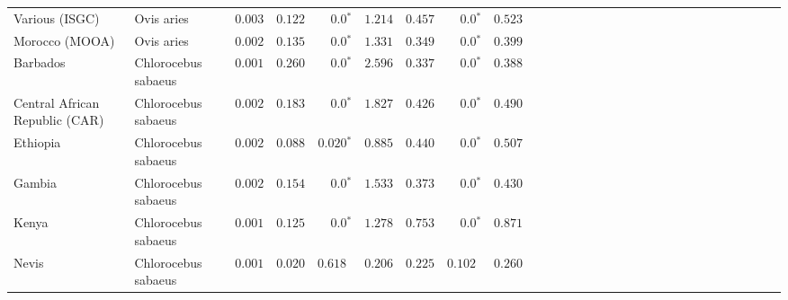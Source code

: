 \begin{center}
\begin{adjustbox}{width = 1\textwidth}
\begin{tabular}{|l|l|r|r|r|r|r|r|r|r|r|r|r|r|r|r|r|r|r|r|r|r|r|r|r|r|r|r|r|}
                 Various (ISGC) &           Ovis aries &           $ 0.003$ &                      $ 0.122$ &                  $\bm{0.0{^*}}$ &                                           $ 1.214$ &                      $ 0.457$ &                  $\bm{0.0{^*}}$ &                                           $ 0.523$ \\
                 Morocco (MOOA) &           Ovis aries &           $ 0.002$ &                      $ 0.135$ &                  $\bm{0.0{^*}}$ &                                           $ 1.331$ &                      $ 0.349$ &                  $\bm{0.0{^*}}$ &                                           $ 0.399$ \\
                       Barbados &  Chlorocebus sabaeus &           $ 0.001$ &                      $ 0.260$ &                  $\bm{0.0{^*}}$ &                                           $ 2.596$ &                      $ 0.337$ &                  $\bm{0.0{^*}}$ &                                           $ 0.388$ \\
 Central African Republic (CAR) &  Chlorocebus sabaeus &           $ 0.002$ &                      $ 0.183$ &                  $\bm{0.0{^*}}$ &                                           $ 1.827$ &                      $ 0.426$ &                  $\bm{0.0{^*}}$ &                                           $ 0.490$ \\
                       Ethiopia &  Chlorocebus sabaeus &           $ 0.002$ &                      $ 0.088$ &               $\bm{ 0.020{^*}}$ &                                           $ 0.885$ &                      $ 0.440$ &                  $\bm{0.0{^*}}$ &                                           $ 0.507$ \\
                         Gambia &  Chlorocebus sabaeus &           $ 0.002$ &                      $ 0.154$ &                  $\bm{0.0{^*}}$ &                                           $ 1.533$ &                      $ 0.373$ &                  $\bm{0.0{^*}}$ &                                           $ 0.430$ \\
                          Kenya &  Chlorocebus sabaeus &           $ 0.001$ &                      $ 0.125$ &                  $\bm{0.0{^*}}$ &                                           $ 1.278$ &                      $ 0.753$ &                  $\bm{0.0{^*}}$ &                                           $ 0.871$ \\
                          Nevis &  Chlorocebus sabaeus &           $ 0.001$ &                      $ 0.020$ &                      $ 0.618~~$ &                                           $ 0.206$ &                      $ 0.225$ &                      $ 0.102~~$ &                                           $ 0.260$ \\

\end{tabular}
\end{adjustbox}
\end{center}

